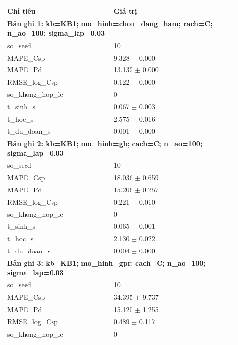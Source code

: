 \begin{longtable}{p{0.43\linewidth}p{0.50\linewidth}}
\toprule Chỉ tiêu & Giá trị \\ \midrule \endhead
\multicolumn{2}{p{0.95\linewidth}}{\textbf{Bản ghi 1: kb=KB1; mo\_hinh=chon\_dang\_ham; cach=C; n\_ao=100; sigma\_lap=0.03}} \\
so\_\allowbreak seed & 10 \\
MAPE\_\allowbreak Csp & 9.328 $\pm$ 0.000 \\
MAPE\_\allowbreak Pd & 13.132 $\pm$ 0.000 \\
RMSE\_\allowbreak log\_\allowbreak Csp & 0.122 $\pm$ 0.000 \\
so\_\allowbreak khong\_\allowbreak hop\_\allowbreak le & 0 \\
t\_\allowbreak sinh\_\allowbreak s & 0.067 $\pm$ 0.003 \\
t\_\allowbreak hoc\_\allowbreak s & 2.575 $\pm$ 0.016 \\
t\_\allowbreak du\_\allowbreak doan\_\allowbreak s & 0.001 $\pm$ 0.000 \\
\midrule
\multicolumn{2}{p{0.95\linewidth}}{\textbf{Bản ghi 2: kb=KB1; mo\_hinh=gb; cach=C; n\_ao=100; sigma\_lap=0.03}} \\
so\_\allowbreak seed & 10 \\
MAPE\_\allowbreak Csp & 18.036 $\pm$ 0.659 \\
MAPE\_\allowbreak Pd & 15.206 $\pm$ 0.257 \\
RMSE\_\allowbreak log\_\allowbreak Csp & 0.221 $\pm$ 0.010 \\
so\_\allowbreak khong\_\allowbreak hop\_\allowbreak le & 0 \\
t\_\allowbreak sinh\_\allowbreak s & 0.065 $\pm$ 0.001 \\
t\_\allowbreak hoc\_\allowbreak s & 2.130 $\pm$ 0.022 \\
t\_\allowbreak du\_\allowbreak doan\_\allowbreak s & 0.004 $\pm$ 0.000 \\
\midrule
\multicolumn{2}{p{0.95\linewidth}}{\textbf{Bản ghi 3: kb=KB1; mo\_hinh=gpr; cach=C; n\_ao=100; sigma\_lap=0.03}} \\
so\_\allowbreak seed & 10 \\
MAPE\_\allowbreak Csp & 34.395 $\pm$ 9.737 \\
MAPE\_\allowbreak Pd & 15.120 $\pm$ 1.255 \\
RMSE\_\allowbreak log\_\allowbreak Csp & 0.489 $\pm$ 0.117 \\
so\_\allowbreak khong\_\allowbreak hop\_\allowbreak le & 0 \\

\end{longtable}
